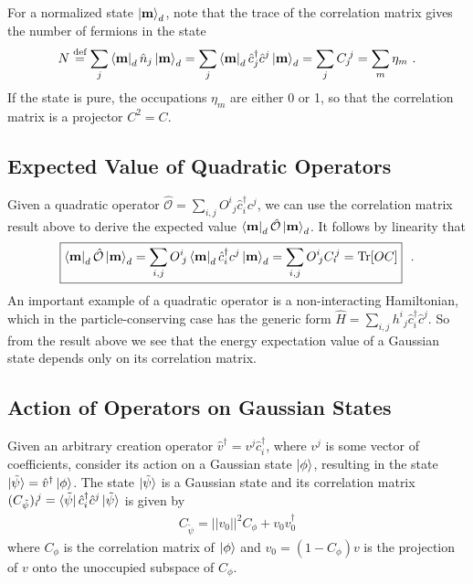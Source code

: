 \documentclass[aps, superscriptaddress, floatfix, onecolumn]{revtex4-2}
\begin{document}
For a normalized state $\ket{\mathbf{m}}_d$, note that the trace of the correlation matrix gives the number of fermions in the state 
\begin{align}
N \stackrel{\text{def}}{=} \sum_j \bra{\mathbf{m}}_d \hat{n}_j \ket{\mathbf{m}}_d = \sum_j \bra{\mathbf{m}}_d \hat{c}^\dagger_j \hat{c}^j \ket{\mathbf{m}}_d = \sum_j C_j\!^j = \sum_m \eta_m \ .
\end{align}
If the state is pure, the occupations $\eta_m$ are either 0 or 1, so that the correlation matrix is a projector $C^2 = C$. 

\subsection{Expected Value of Quadratic Operators}

Given a quadratic operator $\hat{\mathcal{O}} = \sum_{i,j} O^i\!_j \hat{c}^\dagger_i c^j$, we can use the correlation matrix result above to derive the expected value 
$\bra{\mathbf{m}}_d \hat{\mathcal{O}} \ket{\mathbf{m}}_d$. It follows by linearity that
\begin{align}
\boxed{\bra{\mathbf{m}}_d \hat{\mathcal{O}} \ket{\mathbf{m}}_d = \sum_{i,j} O^i\!_j \bra{\mathbf{m}}_d  \hat{c}^\dagger_i c^j\ket{\mathbf{m}}_d = \sum_{i,j} O^i\!_j C_i\!^j = \text{Tr}[O C] } \ \ .
\end{align}
An important example of a quadratic operator is a non-interacting Hamiltonian, which in the particle-conserving case has the generic form $\hat{H} =  \sum_{i,j} h^i\!_j \hat{c}^\dagger_i \hat{c}^j$. So from the result above we see that the energy expectation value of a Gaussian state depends only on its correlation matrix.

\subsection{Action of Operators on Gaussian States}

Given an arbitrary creation operator $\hat{v}^\dagger = v^j \hat{c}^\dagger_i$, where $v^j$ is some vector of coefficients, consider its action on a Gaussian state $\ket{\phi}$, resulting in the state $\ket{\tilde{\psi}} = \hat{v}^\dagger \ket{\phi}$.
The state $\ket{\tilde{\psi}}$ is a Gaussian state and its correlation matrix $( C_{\tilde{\psi}})_i\!^j = \bra{\tilde{\psi}} \hat{c}^\dagger_i \hat{c}^j \ket{\tilde{\psi}}$  is given by 
\begin{align}
\boxed{C_{\tilde{\psi}} = ||v_0||^2 C_\phi + v_0 v_0^\dagger}
\end{align}
where $C_\phi$ is the correlation matrix of $\ket{\phi}$ and $v_0 = (1-C_\phi)v$ is the projection of $v$ onto the unoccupied subspace of $C_\phi$.
\end{document}
